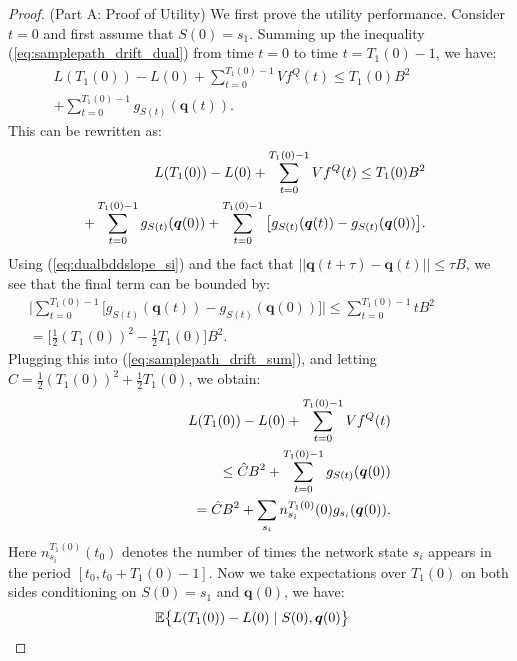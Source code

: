\documentclass[journal]{IEEEtran}
\newcommand{\expect}[1]{\mathbb{E}\big\{#1\big\}}
\newcommand{\bv}[1]{{\boldsymbol{#1} }}
\begin{document}
\begin{proof}
(Part A: Proof of Utility) We first prove the utility performance. 
Consider $t=0$ and first assume that $S(0)=s_1$. 
Summing up the inequality (\ref{eq:samplepath_drift_dual}) from time $t=0$ to time $t=T_{1}(0)-1$, we have:
\begin{eqnarray*}
L(T_{1}(0))-L(0) + \sum_{t=0}^{T_{1}(0)-1}Vf^Q(t) \leq T_{1}(0)B^2 \qquad\qquad\\+ \sum_{t=0}^{T_{1}(0)-1}g_{S(t)}(\bv{q}(t)). 
\end{eqnarray*}
This can be rewritten as: 
\begin{eqnarray}
\hspace{-.3in}&&L(T_{1}(0))-L(0) + \sum_{t=0}^{T_{1}(0)-1}Vf^Q(t)\leq T_{1}(0)B^2 \label{eq:samplepath_drift_sum}\\
\hspace{-.3in}&& \,\,\,+ \sum_{t=0}^{T_{1}(0)-1}g_{S(t)}(\bv{q}(0)) + \sum_{t=0}^{T_{1}(0)-1}\big[ g_{S(t)}(\bv{q}(t)) - g_{S(t)}(\bv{q}(0))\big].\nonumber
\end{eqnarray}
Using (\ref{eq:dualbddslope_si}) and the fact that $||\bv{q}(t+\tau)-\bv{q}(t)||\leq \tau B$, we see that the final term can be bounded by:
\begin{eqnarray*}
\bigg|\sum_{t=0}^{T_{1}(0)-1}\big[ g_{S(t)}(\bv{q}(t)) - g_{S(t)}(\bv{q}(0))\big] \bigg| \leq \sum_{t=0}^{T_{1}(0)-1} t B^2\qquad\qquad \\
= \big[\frac{1}{2}(T_1(0))^2-\frac{1}{2}T_1(0)\big]B^2.
\end{eqnarray*}
Plugging this into (\ref{eq:samplepath_drift_sum}), and letting $\hat{C}=\frac{1}{2}(T_1(0))^2+\frac{1}{2}T_1(0)$, we obtain:
\begin{eqnarray}
\hspace{-.3in}&&L(T_{1}(0))-L(0) + \sum_{t=0}^{T_{1}(0)-1}Vf^Q(t)\\
\hspace{-.3in}&&\qquad\qquad\qquad\leq \hat{C}B^2 + \sum_{t=0}^{T_{1}(0)-1}g_{S(t)}(\bv{q}(0))\nonumber\\
\hspace{-.3in}&& \qquad\qquad\qquad = \hat{C}B^2 + \sum_{s_i} n^{T_1(0)}_{s_i}(0) g_{s_i}(\bv{q}(0)).\nonumber
\end{eqnarray}
Here $n^{T_1(0)}_{s_i}(t_0)$ denotes the number of times the network state $s_i$ appears in the period $[t_0, t_0+T_1(0)-1]$. Now we take expectations over $T_1(0)$ on both sides conditioning on $S(0)=s_1$ and $\bv{q}(0)$, we have:
\begin{eqnarray}
\hspace{-.3in}&&\expect{L(T_{1}(0))-L(0)\left.|\right. S(0), \bv{q}(0)} \label{eq:visittime-expr}\\

\end{eqnarray}
\end{proof}
\end{document}
